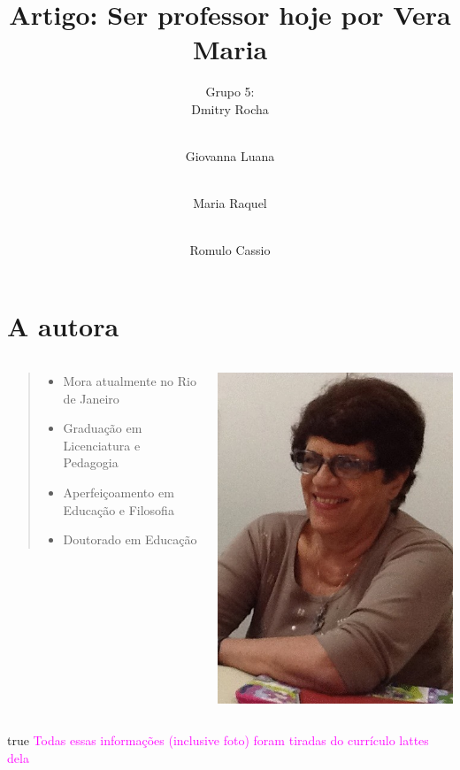 \documentclass[]{beamer}
\author{Grupo 5: \\
  Dmitry Rocha \and \\
  Giovanna Luana \and \\
  Maria Raquel \and \\
  Romulo Cassio
}
\title{Artigo: Ser professor hoje por Vera Maria}
\institute{UFPI}
\newcommand{\obs}[1]{{
  \ifdefined\DRAFT
    \textcolor{magenta}{#1}
  \fi
}}
\def\DRAFT{true}
\begin{document}
  \begin{frame}
    \titlepage
  \end{frame}

  \section{A autora}

  \begin{frame}{\secname}
    \begin{columns}[T]
      \begin{column}{.5\textwidth}
        \begin{block}{}
          \blockquote[{\cite[Currículo Lattes]{_curriculo_}}]{
            \begin{itemize}
              \item Mora atualmente no Rio de Janeiro
              \item Graduação em Licenciatura e Pedagogia
              \item Aperfeiçoamento em Educação e Filosofia
              \item Doutorado em Educação
            \end{itemize}
          }
        \end{block}
      \end{column}
      \begin{column}{.5\textwidth}
        \includegraphics[scale=0.3]{foto.jpeg}
      \end{column}
    \end{columns}

    \obs{
      Todas essas informações (inclusive foto) foram tiradas do currículo
      lattes dela
    }
  \end{frame}
\end{document}
